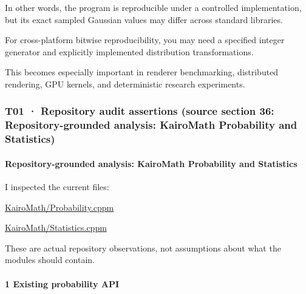 In other words, the program is reproducible under a controlled implementation, but its exact sampled Gaussian values may differ across standard libraries.

For cross-platform bitwise reproducibility, you may need a specified integer generator and explicitly implemented distribution transformations.

This becomes especially important in renderer benchmarking, distributed rendering, GPU kernels, and deterministic research experiments.

\subsubsection{T01 · Repository audit assertions (source section 36: Repository-grounded analysis: KairoMath Probability and Statistics)}\label{02-foundations-ii-ch039-t01-repository-audit-assertions-source-section-36-repository-grounded-analysis-kairomath-probability-and-statistics}

\hypertarget{02-foundations-ii-ch039-t01-repository-audit-assertions-source-section-36-repository-grounded-analysis-kairomath-probability-and-statistics}{}

\paragraph{Repository-grounded analysis: KairoMath Probability and Statistics}\label{02-foundations-ii-ch039-repository-grounded-analysis-kairomath-probability-and-statistics}

\hypertarget{02-foundations-ii-ch039-repository-grounded-analysis-kairomath-probability-and-statistics}{}

I inspected the current files:

\href{https://github.com/swayam8624/KairoMath/blob/master/Probability.cppm?utm_source=chatgpt.com}{KairoMath/Probability.cppm}

\href{https://github.com/swayam8624/KairoMath/blob/master/Statistics.cppm?utm_source=chatgpt.com}{KairoMath/Statistics.cppm}

These are actual repository observations, not assumptions about what the modules should contain.

\paragraph{1 Existing probability API}\label{02-foundations-ii-ch039-existing-probability-api}

